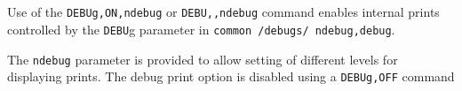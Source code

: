  \\{\smallskip}
 \\{\smallskip}
\headb

Use of the {\tt DEBUg,ON,ndebug} or {\tt DEBU,,ndebug} command
enables internal prints controlled by the {\tt DEBU}g parameter
in {\tt common /debugs/ ndebug,debug}.

The {\tt ndebug} parameter is provided to allow setting of different
levels for displaying prints.  The debug print option is disabled using
a {\tt DEBUg,OFF} command
\vfill\eject

